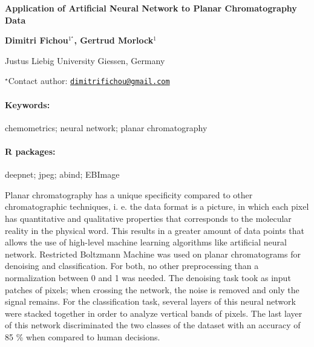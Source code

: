 \documentclass[11pt, a4paper]{article}
\renewcommand{\title}[1]{\begin{center}{\bf \LARGE #1}\end{center}}
\newcommand{\keywords}{\paragraph{Keywords:}}
\newcommand{\packages}{\paragraph{R packages:}}
\begin{document}
\pagestyle{empty}

\title{Application of Artificial Neural Network to Planar Chromatography Data}

\begin{center}
  {\bf Dimitri Fichou$^{1^\star}$, Gertrud Morlock$^{1}$}
\end{center}

\vskip 0.3cm

\begin{affiliations}
\begin{enumerate}
\begin{minipage}{0.915\textwidth}
\centering
\item Justus Liebig University Giessen, Germany \\[-2pt]
\end{minipage}
\end{enumerate}
$^\star$Contact author: \href{mailto:dimitrifichou@gmail.com}{\nolinkurl{dimitrifichou@gmail.com}}\\
\end{affiliations}

\vskip 0.5cm

\begin{minipage}{0.915\textwidth}
\keywords chemometrics; neural network; planar chromatography
\packages deepnet; jpeg; abind; EBImage
\end{minipage}

\vskip 0.8cm

Planar chromatography has a unique specificity compared to other
chromatographic techniques, i. e. the data format is a picture, in which
each pixel has quantitative and qualitative properties that corresponds
to the molecular reality in the physical word. This results in a greater
amount of data points that allows the use of high-level machine learning
algorithms like artificial neural network. Restricted Boltzmann Machine
was used on planar chromatograms for denoising and classification. For
both, no other preprocessing than a normalization between 0 and 1 was
needed. The denoising task took as input patches of pixels; when
crossing the network, the noise is removed and only the signal remains.
For the classification task, several layers of this neural network were
stacked together in order to analyze vertical bands of pixels. The last
layer of this network discriminated the two classes of the dataset with
an accuracy of 85 \% when compared to human decisions.
\end{document}
